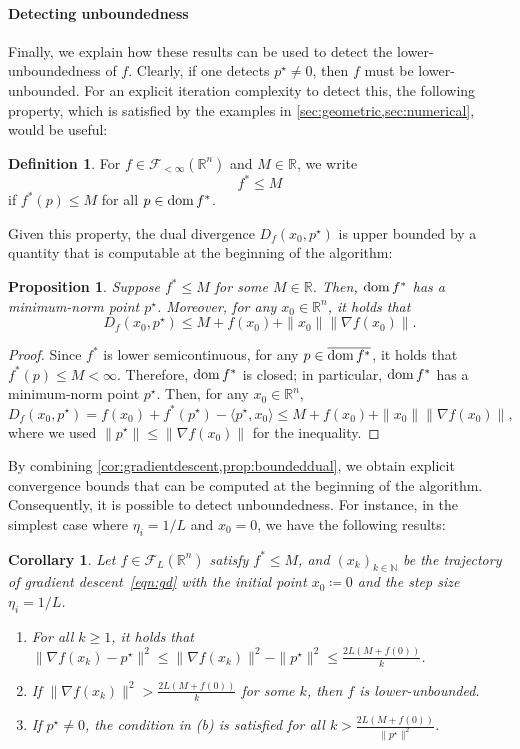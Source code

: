 \documentclass[11pt,a4paper]{article}
\theoremstyle{definition}
\newtheorem{dfn}{Definition}[section]
\theoremstyle{plain}
\newtheorem{prop}[prop]{Proposition}
\newtheorem{cor}[cor]{Corollary}
\newcommand{\RR}{{\mathbb{R}}}
\newcommand{\NN}{{\mathbb{N}}}
\newcommand{\dom}{\mathop{\rm dom}}
\begin{document}
\paragraph{Detecting unboundedness}
Finally, we explain how these results can be used to detect the lower-unboundedness of $f$.
Clearly, if one detects $p^\star \neq 0$, then $f$ must be lower-unbounded.
For an explicit iteration complexity to detect this, the following property, which is satisfied by the examples in \cref{sec:geometric,sec:numerical}, would be useful:
\begin{dfn}\label{dfn:boundeddual}
    For $f \in \mathcal{F}_{<\infty}(\RR^n)$ and $M \in \RR$, we write
    \[
        f^\ast \le M
    \]
    if $f^\ast(p) \le M$ for all $p \in \dom f^\ast$.
\end{dfn}
Given this property, the dual divergence $D_f(x_0, p^\star)$ is upper bounded by a quantity that is computable at the beginning of the algorithm:
\begin{prop}\label{prop:boundeddual}
    Suppose $f^\ast \le M$ for some $M \in \RR$.
    Then, $\dom f^\ast$ has a minimum-norm point $p^\star$.
    Moreover, for any $x_0 \in \RR^n$, it holds that
    \[
        D_f(x_0, p^\star) \le M + f(x_0) + \|x_0\|\|\nabla f(x_0)\|.
    \]
\end{prop}
\begin{proof}
    Since $f^\ast$ is lower semicontinuous, for any $p \in \overline{\dom f^\ast}$, it holds that $f^\ast(p) \le M < \infty$.
    Therefore, $\dom f^\ast$ is closed; in particular, $\dom f^\ast$ has a minimum-norm point $p^\star$.
    Then, for any $x_0 \in \RR^n$,
    \[
        D_f(x_0, p^\star) = f(x_0) + f^\ast(p^\star) - \langle p^\star, x_0\rangle \le M + f(x_0) + \|x_0\|\|\nabla f(x_0)\|,
    \]
    where we used $\|p^\star\| \le \|\nabla f(x_0)\|$ for the inequality.
\end{proof}
By combining \cref{cor:gradientdescent,prop:boundeddual}, we obtain explicit convergence bounds that can be computed at the beginning of the algorithm.
Consequently, it is possible to detect unboundedness.
For instance, in the simplest case where $\eta_i = 1/L$ and $x_0 = 0$, we have the following results:
\begin{cor}\label{cor:gd-detection}
    Let $f \in \mathcal{F}_L(\RR^n)$ satisfy $f^\ast \le M$, and $(x_k)_{k \in \NN}$ be the trajectory of gradient descent~\eqref{eqn:gd} with the initial point $x_0 \coloneqq 0$ and the step size $\eta_i = 1/L$.
    \begin{enumerate}
        \item[(a)] For all $k \ge 1$, it holds that $\|\nabla f(x_k) - p^\star\|^2 \le \|\nabla f(x_k)\|^2 - \|p^\star\|^2 \le \frac{2L(M + f(0))}k$.
        \item[(b)] If $\|\nabla f(x_k)\|^2 > \frac{2L(M + f(0))}k$ for some $k$, then $f$ is lower-unbounded.
        \item[(c)] If $p^\star \neq 0$, the condition in (b) is satisfied for all $k > \frac{2L(M + f(0))}{\|p^\star\|^2}$.
    \end{enumerate}
\end{cor}
\end{document}
